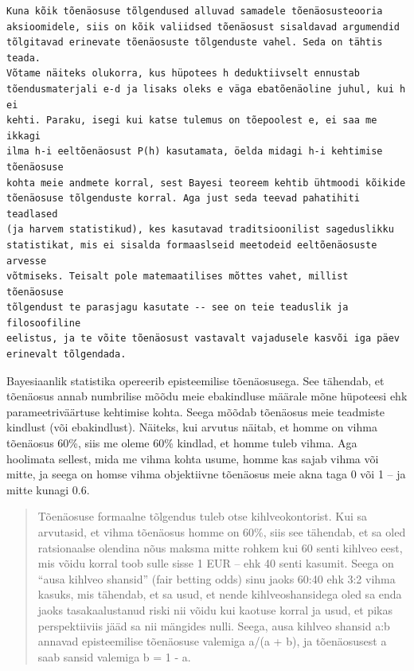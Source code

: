\documentclass[]{book}
\begin{document}
\begin{verbatim}
Kuna kõik tõenäosuse tõlgendused alluvad samadele tõenäosusteooria 
aksioomidele, siis on kõik valiidsed tõenäosust sisaldavad argumendid 
tõlgitavad erinevate tõenäosuste tõlgenduste vahel. Seda on tähtis teada. 
Võtame näiteks olukorra, kus hüpotees h deduktiivselt ennustab 
tõendusmaterjali e-d ja lisaks oleks e väga ebatõenäoline juhul, kui h ei 
kehti. Paraku, isegi kui katse tulemus on tõepoolest e, ei saa me ikkagi 
ilma h-i eeltõenäosust P(h) kasutamata, öelda midagi h-i kehtimise tõenäosuse 
kohta meie andmete korral, sest Bayesi teoreem kehtib ühtmoodi kõikide 
tõenäosuse tõlgenduste korral. Aga just seda teevad pahatihiti teadlased 
(ja harvem statistikud), kes kasutavad traditsioonilist sageduslikku 
statistikat, mis ei sisalda formaaslseid meetodeid eeltõenäosuste arvesse 
võtmiseks. Teisalt pole matemaatilises mõttes vahet, millist tõenäosuse 
tõlgendust te parasjagu kasutate -- see on teie teaduslik ja filosoofiline 
eelistus, ja te võite tõenäosust vastavalt vajadusele kasvõi iga päev 
erinevalt tõlgendada.
\end{verbatim}

Bayesiaanlik statistika opereerib episteemilise tõenäosusega. See tähendab, et tõenäosus annab numbrilise mõõdu meie ebakindluse määrale mõne hüpoteesi ehk parameetriväärtuse kehtimise kohta. Seega mõõdab tõenäosus meie teadmiste kindlust (või ebakindlust). Näiteks, kui arvutus näitab, et homme on vihma tõenäosus 60\%, siis me oleme 60\% kindlad, et homme tuleb vihma. Aga hoolimata sellest, mida me vihma kohta usume, homme kas sajab vihma või mitte, ja seega on homse vihma objektiivne tõenäosus meie akna taga 0 või 1 -- ja mitte kunagi 0.6.

\begin{quote}
Tõenäosuse formaalne tõlgendus tuleb otse kihlveokontorist. Kui sa arvutasid, et vihma tõenäosus homme on 60\%, siis see tähendab, et sa oled ratsionaalse olendina nõus maksma mitte rohkem kui 60 senti kihlveo eest, mis võidu korral toob sulle sisse 1 EUR -- ehk 40 senti kasumit. Seega on ``ausa kihlveo shansid'' (fair betting odds) sinu jaoks 60:40 ehk 3:2 vihma kasuks, mis tähendab, et sa usud, et nende kihlveoshansidega oled sa enda jaoks tasakaalustanud riski nii võidu kui kaotuse korral ja usud, et pikas perspektiiviis jääd sa nii mängides nulli. Seega, ausa kihlveo shansid a:b annavad episteemilise tõenäosuse valemiga a/(a + b), ja tõenäosusest a saab sansid valemiga b = 1 - a.
\end{quote}
\end{document}
